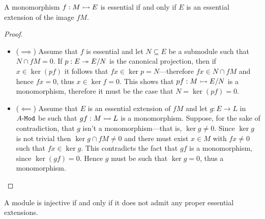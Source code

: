 \begin{proposition}
    \label{prop:essential-iff--codomain-is-essential-extension-of-image}
    A monomorphism \(f: M \rightarrowtail E\) is essential if and only if \(E\) is an
    essential extension of the image \(f M\).
\end{proposition}

\begin{proof}
    \begin{itemize}\setlength\itemsep{0em}
        \item (\(\implies\)) Assume that \(f\) is essential and let \(N \subseteq E\) be a
              submodule such that \(N \cap f M = 0\). If \(p: E \twoheadrightarrow E/N\) is the canonical
              projection, then if \(x \in \ker(p f)\) it follows that
              \(f x \in \ker p = N\)---therefore \(f x \in N \cap f M\) and hence
              \(f x = 0\), thus \(x \in \ker f = 0\). This shows that \(p f: M \rightarrowtail E/N\) is
              a monomorphism, therefore it must be the case that \(N = \ker(p f) = 0\).

        \item (\(\impliedby\)) Assume that \(E\) is an essential extension of \(f M\)
              and let \(g: E \to L\) in \({A\text{-}\texttt{Mod}}\) be such that \(g f: M \rightarrowtail L\) is a
              monomorphism. Suppose, for the sake of contradiction, that \(g\) isn't a
              monomorphism---that is, \(\ker g \neq 0\). Since \(\ker g\) is not trivial then
              \(\ker g \cap f M \neq 0\) and there must exist \(x \in M\) with
              \(f x \neq 0\) such that \(f x \in \ker g\). This contradicts the fact that
              \(g f\) is a monomorphism, since \(\ker(g f) = 0\). Hence \(g\) must be such
              that \(\ker g = 0\), thus a monomorphism.
    \end{itemize}
\end{proof}

\begin{lemma}
    \label{lem:injective-iff-no-proper-essential-extensions}
    A module is injective if and only if it does not admit any proper essential
    extensions.
\end{lemma}

